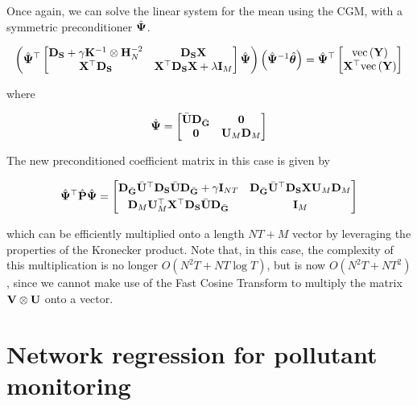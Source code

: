 Once again, we can solve the linear system for the mean using the CGM, with a symmetric preconditioner $\hat{\mathbf{\Psi}}$.  

\begin{equation}
    \left( \hat{\mathbf{\Psi}}^\top \begin{bmatrix}
        \mathbf{D}_{\mathbf{S}} + \gamma \mathbf{K}^{-1} \otimes \mathbf{H}_N^{-2} & \mathbf{D}_{\mathbf{S}}  \mathbf{X} \\
        \mathbf{X}^\top \mathbf{D}_{\mathbf{S}} & \mathbf{X}^\top \mathbf{D}_{\mathbf{S}} \mathbf{X} + \lambda \mathbf{I}_M   
       \end{bmatrix}  \hat{\mathbf{\Psi}} \right) \left( \hat{\mathbf{\Psi}}^{-1} \hat{\boldsymbol{\theta}}\right)   = \hat{\mathbf{\Psi}}^\top \begin{bmatrix} \text{\textup{vec}}\left(\mathbf{Y}\right) \\ \mathbf{X}^\top \text{\textup{vec}}\left(\mathbf{Y}\right) \end{bmatrix}
\end{equation}

where 

\begin{equation}
    \hat{\mathbf{\Psi}} =  \begin{bmatrix}
        \bar{\mathbf{U}} \mathbf{D}_{\bar{\mathbf{G}}} & \mathbf{0} \\
        \mathbf{0} & \mathbf{U}_M \mathbf{D}_M 
    \end{bmatrix}
\end{equation}

The new preconditioned coefficient matrix in this case is given by 

\begin{equation*}
    \hat{\mathbf{\Psi}}^\top \hat{\mathbf{P}}  \hat{\mathbf{\Psi}} = 
       \begin{bmatrix}
        \mathbf{D}_{\bar{\mathbf{G}}} \bar{\mathbf{U}}^\top \mathbf{D}_{\mathbf{S}} \bar{\mathbf{U}} \mathbf{D}_{\bar{\mathbf{G}}} + \gamma \mathbf{I}_{NT}  &  \mathbf{D}_{\bar{\mathbf{G}}} \bar{\mathbf{U}}^\top \mathbf{D}_{\mathbf{S}} \mathbf{X} \mathbf{U}_M \mathbf{D}_M \\[0.1cm] 
        \mathbf{D}_M \mathbf{U}_M^\top \mathbf{X}^\top \mathbf{D}_{\mathbf{S}} \bar{\mathbf{U}} \mathbf{D}_{\bar{\mathbf{G}}} & \mathbf{I}_M
        \end{bmatrix}
\end{equation*}

which can be efficiently multiplied onto a length $NT + M$ vector by leveraging the properties of the Kronecker product. Note that, in this case, the complexity of this multiplication is no longer $O(N^2T + NT \log T)$, but is now $O(N^2T + NT^2)$, since we cannot make use of the Fast Cosine Transform to multiply the matrix $\mathbf{V} \otimes \mathbf{U}$ onto a vector. 


\section{Network regression for pollutant monitoring}

